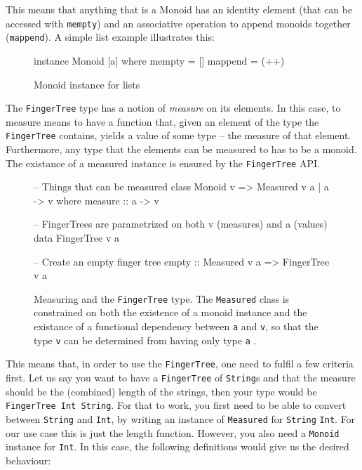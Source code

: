 \documentclass[a4paper,12pt,twosided]{report}
\renewcommand\cite{\citep}
\begin{document}
This means that anything that is a Monoid has an identity element (that can be
accessed with \texttt{mempty}) and an associative operation to append monoids
together (\texttt{mappend}). A simple list example illustrates this:

\begin{figure}[H]
\begin{code}
instance Monoid [a] where
    mempty = []
    mappend = (++)
\end{code}
\caption{Monoid instance for lists}
\end{figure}

The \texttt{FingerTree} type has a notion of \textit{measure} on its elements.
In this case, to measure means to have a function that, given an element of the
type the \texttt{FingerTree} contains, yields a value of some type -- the
measure of that element. Furthermore, any type that the elements can be measured
to has to be a monoid. The existance of a measured instance is ensured by the
\texttt{FingerTree} API. 

\begin{figure}[H]
\begin{code}
-- Things that can be measured
class Monoid v => Measured v a | a -> v where
    measure :: a -> v

-- FingerTrees are parametrized on both v (measures) and a (values)
data FingerTree v a

-- Create an empty finger tree
empty :: Measured v a => FingerTree v a
\end{code}
\caption{Measuring and the \texttt{FingerTree} type. The \texttt{Measured} class
is constrained on both the existence of a monoid instance and the existance of a
functional dependency between \texttt{a} and \texttt{v}, so that the type
\texttt{v} can be determined from having only type \texttt{a} \cite{fundeps}.} 
\end{figure}

This means that, in order to use the \texttt{FingerTree}, one need to fulfil a
few criteria first. Let us say you want to have a \texttt{FingerTree} of
\texttt{String}s and that the measure should be the (combined) length of the
strings, then your type would be \texttt{FingerTree Int String}. For that to
work, you first need to be able to convert between \texttt{String} and
\texttt{Int}, by writing an instance of \texttt{Measured} for \texttt{String}
\texttt{Int}. For our use case this is just the length function. However, you
also need a \texttt{Monoid} instance for \texttt{Int}. In this case, the
following definitions would give us the desired behaviour:
\end{document}
